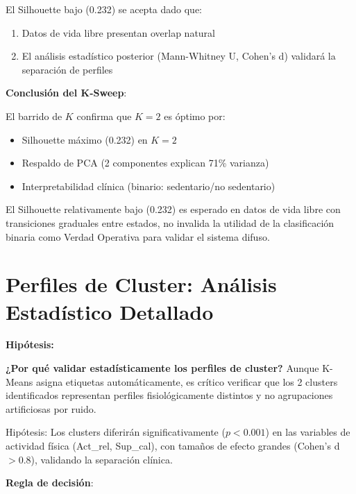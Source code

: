 \documentclass[12pt,letterpaper,twoside]{report}
\begin{document}
\begin{calculobox}
\begin{decisionbox}
El Silhouette bajo (0.232) se acepta dado que:
\begin{enumerate}[noitemsep]
    \item Datos de vida libre presentan overlap natural
    \item El análisis estadístico posterior (Mann-Whitney U, Cohen's d) validará la separación de perfiles
\end{enumerate}
\end{decisionbox}

\begin{conclusionbox}
\textbf{Conclusión del K-Sweep}:

El barrido de $K$ confirma que $K=2$ es óptimo por:
\begin{itemize}[noitemsep]
    \item Silhouette máximo (0.232) en $K=2$
    \item Respaldo de PCA (2 componentes explican 71\% varianza)
    \item Interpretabilidad clínica (binario: sedentario/no sedentario)
\end{itemize}

El Silhouette relativamente bajo (0.232) es esperado en datos de vida libre con transiciones graduales entre estados, no invalida la utilidad de la clasificación binaria como Verdad Operativa para validar el sistema difuso.
\end{conclusionbox}

\section{Perfiles de Cluster: Análisis Estadístico Detallado}

\begin{hipotesisbox}
\textbf{Hipótesis:}

\textbf{¿Por qué validar estadísticamente los perfiles de cluster?} Aunque K-Means asigna etiquetas automáticamente, es crítico verificar que los 2 clusters identificados representan perfiles fisiológicamente distintos y no agrupaciones artificiosas por ruido.

Hipótesis: Los clusters diferirán significativamente ($p < 0.001$) en las variables de actividad física (Act\_rel, Sup\_cal), con tamaños de efecto grandes (Cohen's d $> 0.8$), validando la separación clínica.
\end{hipotesisbox}

\begin{reglabox}
\textbf{Regla de decisión}:


\end{reglabox}
\end{calculobox}
\end{document}
